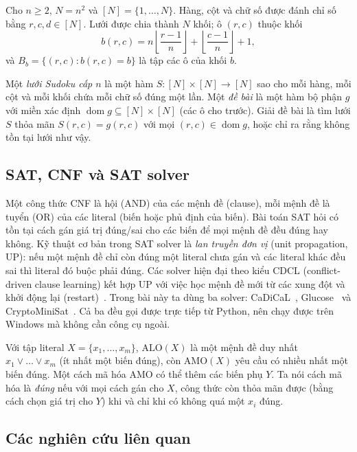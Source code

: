 \documentclass[a4paper,fleqn]{cas-sc}
\newcommand{\AMO}{\mathrm{AMO}}
\newcommand{\ALO}{\mathrm{ALO}}
\newcommand{\dom}{\operatorname{dom}}
\begin{document}
Cho $n\ge 2$, $N=n^2$ và $[N]=\{1,\dots,N\}$. Hàng, cột và chữ số được đánh chỉ số bằng $r,c,d\in[N]$. Lưới được chia thành $N$ khối; ô $(r,c)$ thuộc khối
\begin{equation}
b(r,c)=n\left\lfloor \frac{r-1}{n}\right\rfloor+\left\lfloor \frac{c-1}{n}\right\rfloor+1, \label{eq:box}
\end{equation}
và $B_b=\{(r,c): b(r,c)=b\}$ là tập các ô của khối $b$.

\begin{definition}\label{def:sudoku}
Một \emph{lưới Sudoku cấp $n$} là một hàm $S:[N]\times[N]\to[N]$ sao cho mỗi hàng, mỗi cột và mỗi khối chứa mỗi chữ số đúng một lần. Một \emph{đề bài} là một hàm bộ phận $g$ với miền xác định $\dom g\subseteq[N]\times[N]$ (các ô cho trước). Giải đề bài là tìm lưới $S$ thỏa mãn $S(r,c)=g(r,c)$ với mọi $(r,c)\in\dom g$, hoặc chỉ ra rằng không tồn tại lưới như vậy.
\end{definition}

\subsection{SAT, CNF và SAT solver}\label{sec:sat-bg}

Một công thức CNF là hội (AND) của các mệnh đề (clause), mỗi mệnh đề là tuyển (OR) của các literal (biến hoặc phủ định của biến). Bài toán SAT hỏi có tồn tại cách gán giá trị đúng/sai cho các biến để mọi mệnh đề đều đúng hay không. Kỹ thuật cơ bản trong SAT solver là \emph{lan truyền đơn vị} (unit propagation, UP): nếu một mệnh đề chỉ còn đúng một literal chưa gán và các literal khác đều sai thì literal đó buộc phải đúng. Các solver hiện đại theo kiểu CDCL (conflict-driven clause learning) kết hợp UP với việc học mệnh đề mới từ các xung đột và khởi động lại (restart)~\citep{een2003}. Trong bài này ta dùng ba solver: CaDiCaL~\citep{biere2020}, Glucose~\citep{audemard2009} và CryptoMiniSat~\citep{soos2009}. Cả ba đều gọi được trực tiếp từ Python, nên chạy được trên Windows mà không cần công cụ ngoài.

Với tập literal $X=\{x_1,\dots,x_m\}$, $\ALO(X)$ là một mệnh đề duy nhất $x_1\vee\dots\vee x_m$ (ít nhất một biến đúng), còn $\AMO(X)$ yêu cầu có nhiều nhất một biến đúng. Một cách mã hóa AMO có thể thêm các biến phụ $Y$. Ta nói cách mã hóa là \emph{đúng} nếu với mọi cách gán cho $X$, công thức còn thỏa mãn được (bằng cách chọn giá trị cho $Y$) khi và chỉ khi có không quá một $x_i$ đúng.

\subsection{Các nghiên cứu liên quan}\label{sec:related}
\end{document}
